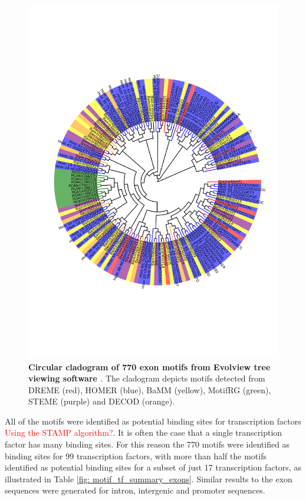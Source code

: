 \documentclass[12pt, onecolumn, oneside]{gsajnl}
\begin{document}
\begin{figure}[ht] 
     \includegraphics[width= \textwidth]{plots/exon_pilot_cardiogram.pdf} 
    \caption{{\bf Circular cladogram of 770 exon motifs from Evolview tree viewing software \cite{he2016evolview} }. 
    The cladogram depicts motifs detected from DREME (red), HOMER (blue), BaMM (yellow), MotifRG (green), STEME (purple)
    and DECOD (orange). }
    \label{fig: exon_cladogram}
\end{figure}

All of the motifs were identified as potential binding sites for transcription factors \textcolor{red}{Using the STAMP algorithm?}. It is often the case that a single transcription factor has many binding sites. For this reason the 770 motifs were identified as binding sites for 99 transcription factors, with more than half the motifs identified as potential binding sites for a subset of just 17 transcription factors, as illustrated in Table \ref{fig: motif_tf_summary_exons}. Similar results 
to the exon sequences were generated for intron, intergenic and promoter sequences.
\end{document}
